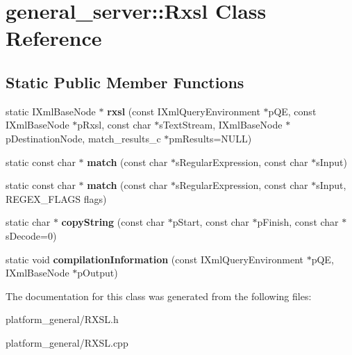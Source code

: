 \hypertarget{classgeneral__server_1_1Rxsl}{\section{general\-\_\-server\-:\-:\-Rxsl \-Class \-Reference}
\label{classgeneral__server_1_1Rxsl}
}
\subsection*{\-Static \-Public \-Member \-Functions}
\begin{DoxyCompactItemize}
\item 
\hypertarget{classgeneral__server_1_1Rxsl_a60d5e70b8e3f645da35b7d0e9b909127}{static \-I\-Xml\-Base\-Node $\ast$ {\bfseries rxsl} (const \-I\-Xml\-Query\-Environment $\ast$p\-Q\-E, const \-I\-Xml\-Base\-Node $\ast$p\-Rxsl, const char $\ast$s\-Text\-Stream, \-I\-Xml\-Base\-Node $\ast$p\-Destination\-Node, match\-\_\-results\-\_\-c $\ast$pm\-Results=\-N\-U\-L\-L)}\label{classgeneral__server_1_1Rxsl_a60d5e70b8e3f645da35b7d0e9b909127}

\item 
\hypertarget{classgeneral__server_1_1Rxsl_acd1b4ea9f649325ef2b754982ae26bff}{static const char $\ast$ {\bfseries match} (const char $\ast$s\-Regular\-Expression, const char $\ast$s\-Input)}\label{classgeneral__server_1_1Rxsl_acd1b4ea9f649325ef2b754982ae26bff}

\item 
\hypertarget{classgeneral__server_1_1Rxsl_a97ef0d6191aee3e83640b96d94af4014}{static const char $\ast$ {\bfseries match} (const char $\ast$s\-Regular\-Expression, const char $\ast$s\-Input, \-R\-E\-G\-E\-X\-\_\-\-F\-L\-A\-G\-S flags)}\label{classgeneral__server_1_1Rxsl_a97ef0d6191aee3e83640b96d94af4014}

\item 
\hypertarget{classgeneral__server_1_1Rxsl_aad5d7cea6d7167e10be0527cd2833e23}{static char $\ast$ {\bfseries copy\-String} (const char $\ast$p\-Start, const char $\ast$p\-Finish, const char $\ast$s\-Decode=0)}\label{classgeneral__server_1_1Rxsl_aad5d7cea6d7167e10be0527cd2833e23}

\item 
\hypertarget{classgeneral__server_1_1Rxsl_a3de22f2d3d83eabe84f49ef11b10128b}{static void {\bfseries compilation\-Information} (const \-I\-Xml\-Query\-Environment $\ast$p\-Q\-E, \-I\-Xml\-Base\-Node $\ast$p\-Output)}\label{classgeneral__server_1_1Rxsl_a3de22f2d3d83eabe84f49ef11b10128b}

\end{DoxyCompactItemize}


\-The documentation for this class was generated from the following files\-:\begin{DoxyCompactItemize}
\item 
platform\-\_\-general/\-R\-X\-S\-L.\-h\item 
platform\-\_\-general/\-R\-X\-S\-L.\-cpp\end{DoxyCompactItemize}
